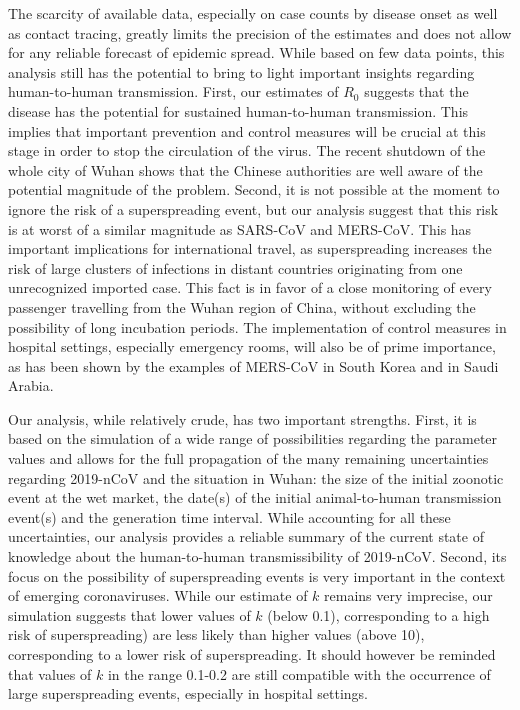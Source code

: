 \documentclass{article}
\begin{document}
The scarcity of available data, especially on case counts by disease onset as well as contact tracing, greatly limits the precision of the estimates and does not allow for any reliable forecast of epidemic spread.
While based on few data points, this analysis still has the potential to bring to light important insights regarding human-to-human transmission.
First, our estimates of $R_0$ suggests that the disease has the potential for sustained human-to-human transmission.
This implies that important prevention and control measures will be crucial at this stage in order to stop the circulation of the virus.
The recent shutdown of the whole city of Wuhan shows that the Chinese authorities are well aware of the potential magnitude of the problem.
Second, it is not possible at the moment to ignore the risk of a superspreading event, but our analysis suggest that this risk is at worst of a similar magnitude as SARS-CoV and MERS-CoV.
This has important implications for international travel, as superspreading increases the risk of large clusters of infections in distant countries originating from one unrecognized imported case.
This fact is in favor of a close monitoring of every passenger travelling from the Wuhan region of China, without excluding the possibility of long incubation periods.
The implementation of control measures in hospital settings, especially emergency rooms, will also be of prime importance, as has been shown by the examples of MERS-CoV in South Korea\cite{oh2015middle} and in Saudi Arabia.\cite{assiri2013hospital} 

Our analysis, while relatively crude, has two important strengths.
First, it is based on the simulation of a wide range of possibilities regarding the parameter values and allows for the full propagation of the many remaining uncertainties regarding 2019-nCoV and the situation in Wuhan: the size of the initial zoonotic event at the wet market, the date(s) of the initial animal-to-human transmission event(s) and the generation time interval.
While accounting for all these uncertainties, our analysis provides a reliable summary of the current state of knowledge about the human-to-human transmissibility of 2019-nCoV.
Second, its focus on the possibility of superspreading events is very important in the context of emerging coronaviruses.\cite{Lloyd-Smith:2005,Althaus:2015b}
While our estimate of $k$ remains very imprecise, our simulation suggests that lower values of $k$ (below 0.1), corresponding to a high risk of superspreading) are less likely than higher values (above 10), corresponding to a lower risk of superspreading.
It should however be reminded that values of $k$ in the range 0.1-0.2 are still compatible with the occurrence of large superspreading events, especially in hospital settings.\cite{oh2015middle,assiri2013hospital} 
\end{document}
